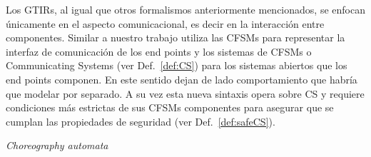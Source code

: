 Los GTIRs, al igual que otros formalismos anteriormente mencionados, se enfocan únicamente en el aspecto comunicacional, es decir en la interacción entre componentes. Similar a nuestro trabajo utiliza las CFSMs para representar la interfaz de comunicación de los end points y los sistemas de CFSMs o Communicating Systems (ver Def.~\ref{def:CS}) para los sistemas abiertos que los end points componen. En este sentido dejan de lado comportamiento que habría que modelar por separado. A su vez esta nueva sintaxis opera sobre CS y requiere condiciones más estrictas de sus CFSMs componentes para asegurar que se cumplan las propiedades de seguridad (ver Def.~\ref{def:safeCS}).

\emph{Choreography automata} \cite{---}

